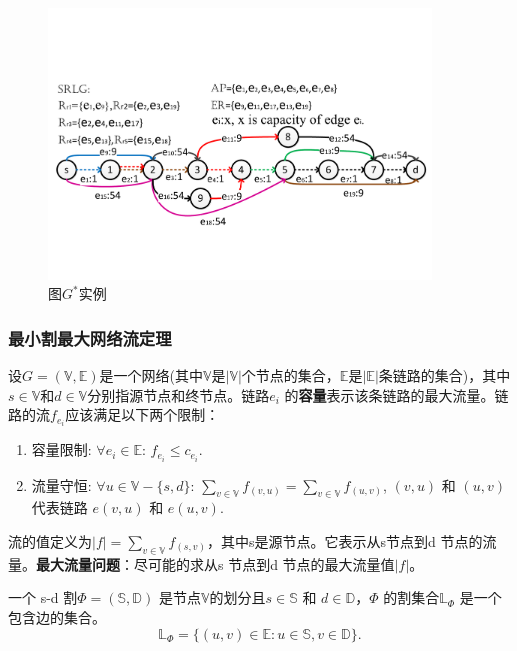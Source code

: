\begin{figure}[tp]
  \centering
  \includegraphics[width=4.0in]{figures/FlowStarGraph}
  \caption{图$G^*$实例}\label{fig:FlowStarGraph}
\end{figure}



\subsubsection{最小割最大网络流定理}
\label{subsubsec:maxFlow}
设$G=(\mathbb{\mathbb{V}},\mathbb{\mathbb{E}})$是一个网络(其中$\mathbb{\mathbb{V}}$是$|\mathbb{\mathbb{V}}|$个节点的集合，$\mathbb{\mathbb{E}}$是$|\mathbb{\mathbb{E}}|$条链路的集合)，其中$s\in \mathbb{V}$和$d\in \mathbb{V}$分别指源节点和终节点。链路$e_i$ 的\textbf{容量}表示该条链路的最大流量。链路的流$f_{e_i}$应该满足以下两个限制：
\begin{enumerate}
  \item 容量限制: $\forall e_i\in \mathbb{\mathbb{E}}$: $f_{e_i}\leq c_{e_i}$.
  \item 流量守恒: $\forall u\in \mathbb{\mathbb{V}}-\{s,d\}$: $\sum\limits_{v\in \mathbb{V}}f_{(v,u)}=\sum\limits_{v\in \mathbb{V}}f_{(u,v)}$,  $(v,u)$ 和 $(u,v)$ 代表链路 $e(v,u)$ 和 $e(u,v)$.
\end{enumerate}

流的值定义为$|f|=\sum\limits_{v\in \mathbb{V}}f_{(s,v)}$，其中s是源节点。它表示从s节点到d 节点的流量。\textbf{最大流量问题}：尽可能的求从s 节点到d 节点的最大流量值$|f|$。

一个 s-d 割${\Phi}=(\mathbb{S},\mathbb{D})$ 是节点$\mathbb{V}$的划分且$s \in \mathbb{S}$ 和 $d \in \mathbb{D}$，$\Phi$ 的割集合$\mathbb{\mathbb{L}}_{\Phi}$ 是一个包含边的集合。
\begin{equation}
\mathbb{\mathbb{L}}_{\Phi}=\{(u,v)\in \mathbb{E}: u \in \mathbb{S}, v \in \mathbb{D}\}.
\end{equation}

